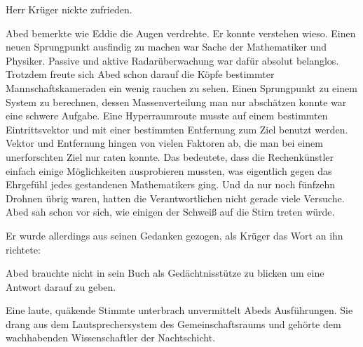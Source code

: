 \par

Herr Krüger nickte zufrieden. 

\par

Abed bemerkte wie Eddie die Augen verdrehte. Er konnte verstehen wieso. Einen neuen Sprungpunkt ausfindig zu machen war Sache der Mathematiker und Physiker. Passive und aktive Radarüberwachung war dafür absolut belanglos. Trotzdem freute sich Abed schon darauf die Köpfe bestimmter Mannschaftskameraden ein wenig rauchen zu sehen. Einen Sprungpunkt zu einem System zu berechnen, dessen Massenverteilung man nur abschätzen konnte war eine schwere Aufgabe. Eine Hyperraumroute musste auf einem bestimmten Eintrittsvektor und mit einer bestimmten Entfernung zum Ziel benutzt werden. Vektor und Entfernung hingen von vielen Faktoren ab, die man bei einem unerforschten Ziel nur raten konnte. Das bedeutete, dass die Rechenkünstler einfach einige Möglichkeiten ausprobieren mussten, was eigentlich gegen das Ehrgefühl jedes gestandenen Mathematikers ging. Und da nur noch fünfzehn Drohnen übrig waren, hatten die Verantwortlichen nicht gerade viele Versuche. Abed sah schon vor sich, wie einigen der Schweiß auf die Stirn treten würde.

\par

Er wurde allerdings aus seinen Gedanken gezogen, als Krüger das Wort an ihn richtete: 

\par

Abed brauchte nicht in sein Buch als Gedächtnisstütze zu blicken um eine Antwort darauf zu geben. 

\par

Eine laute, quäkende Stimmte unterbrach unvermittelt Abeds Ausführungen. Sie drang aus dem Lautsprechersystem des Gemeinschaftsraums und gehörte dem wachhabenden Wissenschaftler der Nachtschicht. 

